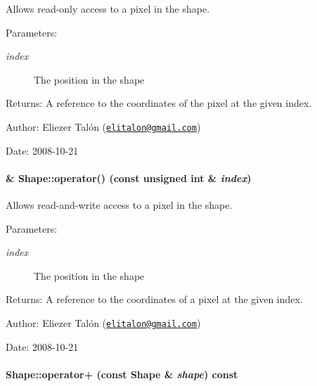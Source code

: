 Allows read-only access to a pixel in the shape. 

\begin{Desc}
\item[Parameters:]
\begin{description}
\item[{\em index}]The position in the shape\end{description}
\end{Desc}
\begin{Desc}
\item[Returns:]A reference to the coordinates of the pixel at the given index.\end{Desc}
\begin{Desc}
\item[Author:]Eliezer Talón (\href{mailto:elitalon@gmail.com}{\tt elitalon@gmail.com}) \end{Desc}
\begin{Desc}
\item[Date:]2008-10-21 \end{Desc}
\hypertarget{class_shape_7d12f3a76e2bfb7963c00237eba41e0a}{
\paragraph[{operator()}]{ \& Shape::operator() (const unsigned int \& {\em index})}\hfill}
\label{class_shape_7d12f3a76e2bfb7963c00237eba41e0a}


Allows read-and-write access to a pixel in the shape. 

\begin{Desc}
\item[Parameters:]
\begin{description}
\item[{\em index}]The position in the shape\end{description}
\end{Desc}
\begin{Desc}
\item[Returns:]A reference to the coordinates of a pixel at the given index.\end{Desc}
\begin{Desc}
\item[Author:]Eliezer Talón (\href{mailto:elitalon@gmail.com}{\tt elitalon@gmail.com}) \end{Desc}
\begin{Desc}
\item[Date:]2008-10-21 \end{Desc}
\hypertarget{class_shape_4e1517d6e14471df4750bc241f517b4e}{
\paragraph[{operator+}]{ Shape::operator+ (const {\bf Shape} \& {\em shape}) const}\hfill}
\label{class_shape_4e1517d6e14471df4750bc241f517b4e}



